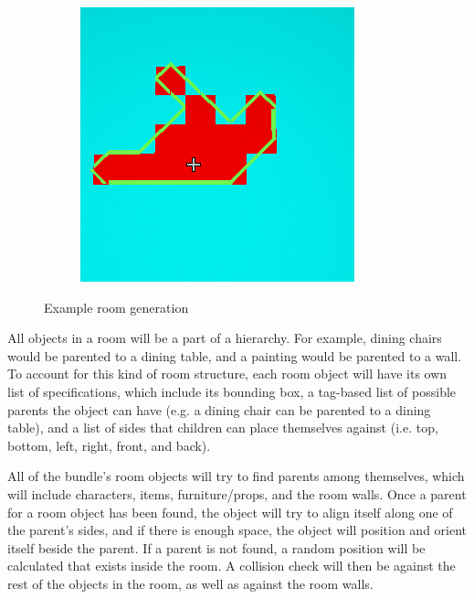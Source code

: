 \begin{figure}[htb]
\begin{subfigure}{.24\textwidth}
  \end{subfigure}%
  \begin{subfigure}{.24\textwidth}
    \centering
    \includegraphics[width=.9\linewidth]{images/maps3}
  \end{subfigure}%
  \caption{Example room generation}
  \label{fig:room_generation_example}
\end{figure}

All objects in a room will be a part of a hierarchy. For example, dining chairs would be parented to a dining table, and a painting would be parented to a wall. To account for this kind of room structure, each room object will have its own list of specifications, which include its bounding box, a tag-based list of possible parents the object can have (e.g. a dining chair can be parented to a dining table), and a list of sides that children can place themselves against (i.e. top, bottom, left, right, front, and back).

 All of the bundle's room objects will try to find parents among themselves, which will include characters, items, furniture/props, and the room walls. Once a parent for a room object has been found, the object will try to align itself along one of the parent's sides, and if there is enough space, the object will position and orient itself beside the parent. If a parent is not found, a random position will be calculated that exists inside the room. A collision check will then be against the rest of the objects in the room, as well as against the room walls.

